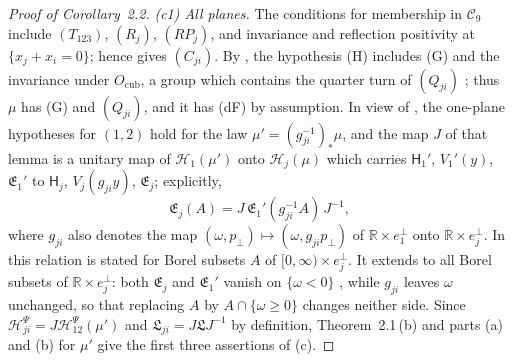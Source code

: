 \documentclass[11pt]{amsart}
\theoremstyle{definition}
\begin{document}
\begin{proof}[Proof of Corollary~2.2]
\emph{(c1) All planes.}
The conditions for membership in $\mathcal C_9$ include $(T_{123})$, $(R_j)$, $(RP_j)$, and invariance and reflection positivity at $\{x_j+x_i=0\}$; hence \cite[Theorem~12.21\,(c)]{QEDII} gives $(C_{ji})$.
By \cite[Definition~2.38]{QEDII}, the hypothesis (H) includes (G) and the invariance under $O_{\mathrm{cub}}$, a group which contains the quarter turn of $(Q_{ji})$ \cite[Definition~14.1]{QEDII}; thus $\mu$ has (G) and $(Q_{ji})$, and it has (dF) by assumption.
In view of \cite[Lemma~14.12\,(d)]{QEDII}, the one-plane hypotheses for $(1,2)$ hold for the law $\mu'=(g_{ji}^{-1})_*\mu$, and the map $J$ of that lemma is a unitary map of $\mathcal H_1(\mu')$ onto $\mathcal H_j(\mu)$ which carries $\mathsf H_1'$, $V_1'(y)$, $\mathfrak E_1'$ to $\mathsf H_j$, $V_j(g_{ji}y)$, $\mathfrak E_j$; explicitly,
\begin{equation*}
\mathfrak E_j(A)=J\,\mathfrak E_1'(g_{ji}^{-1}A)\,J^{-1},
\end{equation*}
where $g_{ji}$ also denotes the map $(\omega,p_\perp)\mapsto(\omega,g_{ji}p_\perp)$ of $\mathbb R\times e_1^\perp$ onto $\mathbb R\times e_j^\perp$.
In \cite[Lemma~14.12\,(d)]{QEDII} this relation is stated for Borel subsets $A$ of $[0,\infty)\times e_j^\perp$.
It extends to all Borel subsets of $\mathbb R\times e_j^\perp$: both $\mathfrak E_j$ and $\mathfrak E_1'$ vanish on $\{\omega<0\}$ \cite[Lemma~12.18\,(b)]{QEDII}, while $g_{ji}$ leaves $\omega$ unchanged, so that replacing $A$ by $A\cap\{\omega\ge0\}$ changes neither side.
Since $\mathcal H^{\Psi}_{ji}=J\mathcal H^{\Psi}_{12}(\mu')$ and $\mathfrak L_{ji}=J\mathfrak LJ^{-1}$ by definition, Theorem~2.1\,(b) and parts (a) and (b) for $\mu'$ give the first three assertions of (c).


\end{proof}
\end{document}
